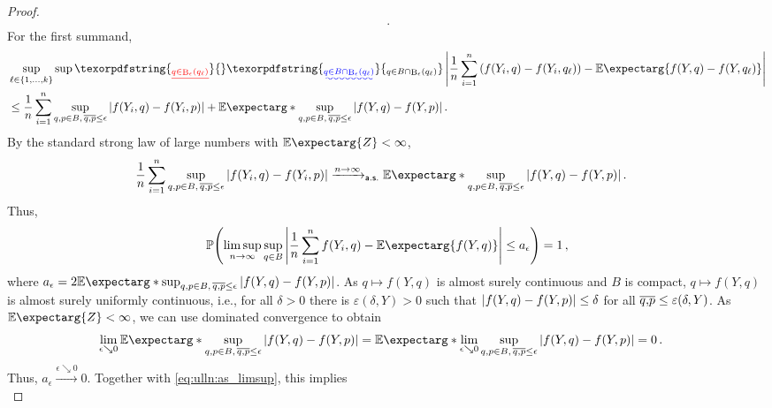 \documentclass{scrartcl}
\newcommand{\PrOf}[1]{\Pr\mathopen{}\lb #1 \rb\mathclose{}}
\DeclareMathOperator{\ball}{\mathrm{B}}
\newcommand{\Ex}{\E\expectarg}
\newcommand*{\ms}[1]{\mathsf{#1}}
\newcommand{\equationFullstop}{\, .}
\newcommand{\eqfs}{\equationFullstop}
\newcommand{\equationComma}{\, ,}
\newcommand{\eqcm}{\equationComma}
\newcommand{\sol}[2]{\overline{#1,#2}}
\theoremstyle{plain}\newtheorem{theorem}{Theorem}[section]
\theoremstyle{definition}
\theoremstyle{remark}
\providecommand{\DIFaddtex}[1]{{\protect\color{blue}\uwave{#1}}} %
\providecommand{\DIFdeltex}[1]{{\protect\color{red}\sout{#1}}}                      %
\providecommand{\DIFaddbegin}{} %
\providecommand{\DIFaddend}{} %
\providecommand{\DIFdelbegin}{} %
\providecommand{\DIFdelend}{} %
\providecommand{\DIFadd}[1]{\texorpdfstring{\DIFaddtex{#1}}{#1}} %
\providecommand{\DIFdel}[1]{\texorpdfstring{\DIFdeltex{#1}}{}} %
\newcommand{\DIFscaledelfig}{0.5}
\newlength{\DIFdelgraphicswidth} %
\newlength{\DIFdelgraphicsheight} %
\newcommand{\DIFaddincludegraphics}[2][]{{\color{blue}\fbox{\DIFOincludegraphics[#1]{#2}}}} %
\newcommand{\DIFdelincludegraphics}[2][]{%
\sbox{\DIFdelgraphicsbox}{\DIFOincludegraphics[#1]{#2}}%
\settoboxwidth{\DIFdelgraphicswidth}{\DIFdelgraphicsbox} %
\settoboxtotalheight{\DIFdelgraphicsheight}{\DIFdelgraphicsbox} %
\scalebox{\DIFscaledelfig}{%
\parbox[b]{\DIFdelgraphicswidth}{\usebox{\DIFdelgraphicsbox}\\[-\baselineskip] \rule{\DIFdelgraphicswidth}{0em}}\llap{\resizebox{\DIFdelgraphicswidth}{\DIFdelgraphicsheight}{%
\setlength{\unitlength}{\DIFdelgraphicswidth}%
\begin{picture}(1,1)%
\thicklines\linethickness{2pt} %
{\color[rgb]{1,0,0}\put(0,0){\framebox(1,1){}}}%
{\color[rgb]{1,0,0}\put(0,0){\line( 1,1){1}}}%
{\color[rgb]{1,0,0}\put(0,1){\line(1,-1){1}}}%
\end{picture}%
}\hspace*{3pt}}} %
} %
\DeclareRobustCommand{\DIFaddbegin}{\DIFOaddbegin \let\includegraphics\DIFaddincludegraphics} %
\DeclareRobustCommand{\DIFaddend}{\DIFOaddend \let\includegraphics\DIFOincludegraphics} %
\DeclareRobustCommand{\DIFdelbegin}{\DIFOdelbegin \let\includegraphics\DIFdelincludegraphics} %
\DeclareRobustCommand{\DIFdelend}{\DIFOaddend \let\includegraphics\DIFOincludegraphics} %
\begin{document}
\begin{appendix}
\begin{proof}
\begin{align*}
\eqfs
\end{align*}
For the first summand,
\begin{align*}
	&\sup_{\ell \in \cb{1,\dots, k}} 
	\sup\DIFdelbegin \DIFdel{_{q\in \ball_\epsilon(q_\ell)}  
		}\DIFdelend \DIFaddbegin \DIFadd{_{q\in B \cap \ball_\epsilon(q_\ell)}
		}\DIFaddend \abs{\frac{1}n \sum_{i=1}^n \br{f(Y_i, q) - f(Y_i, q_\ell)} - \Ex{f(Y, q) - f(Y, q_\ell)}}
	\\& \leq
	\frac{1}n \sum_{i=1}^n \sup_{q,p\in B,\, \sol qp \leq \epsilon} \abs{f(Y_i, q) - f(Y_i, p)} 
	+ 
	\Ex*{\sup_{q,p\in B,\, \sol qp \leq \epsilon} \abs{f(Y, q) - f(Y, p)}} 
	\eqfs
\end{align*}
By the standard strong law of large numbers with $\Ex{Z} < \infty$, 
\begin{align*}
	\frac{1}n \sum_{i=1}^n \sup_{q,p\in B,\, \sol qp \leq \epsilon} \abs{f(Y_i, q) - f(Y_i, p)} 
	&\xrightarrow{n \to \infty}_{\ms{a.s.}} 
	\Ex*{\sup_{q,p\in B,\, \sol qp \leq \epsilon} \abs{f(Y, q) - f(Y, p)} }
	\eqfs
\end{align*}
Thus,
\begin{equation}\label{eq:ulln:as_limsup}
	\PrOf{
		\limsup_{n\to\infty} \sup_{q\in B} \abs{\frac{1}n \sum_{i=1}^n f(Y_i, q) - \Ex{f(Y, q)}}
		\leq
		a_\epsilon
	} = 1
	\eqcm
\end{equation}
where $a_\epsilon = 2 \Ex*{\sup_{q,p\in B,\, \sol qp \leq \epsilon} \abs{f(Y, q) - f(Y, p)} }$.
As $q \mapsto f(Y, q)$ is almost surely continuous and $B$ is compact, $q \mapsto f(Y, q)$ is almost surely uniformly continuous, i.e., for all $\delta > 0$ there is $\varepsilon(\delta, Y) > 0$ such that $\left| f(Y,q)-f(Y,p) \right| \leq \delta$ for all $\overline{q,\!p} \leq \varepsilon(\delta, Y)$.
As $\Ex{Z} < \infty$, we can use dominated convergence to obtain 
\begin{align*}
	\lim_{\epsilon\searrow0} 	\DIFdelbegin %
\DIFdelend \DIFaddbegin \Ex*{\sup_{q,p\in B,\, \sol qp \leq \epsilon} \abs{f(Y, q) - f(Y, p)} }
	\DIFaddend &=
	\DIFdelbegin %
\DIFdelend \DIFaddbegin \Ex*{\lim_{\epsilon\searrow0}\sup_{q,p\in B,\, \sol qp \leq \epsilon} \abs{f(Y, q) - f(Y, p)} }
	\DIFaddend =
	0
	\eqfs
\end{align*}
Thus, $a_\epsilon \xrightarrow{\epsilon\searrow0} 0$. Together with \eqref{eq:ulln:as_limsup}, this implies
\begin{equation*}

\end{equation*}
\end{proof}
\end{appendix}
\end{document}
